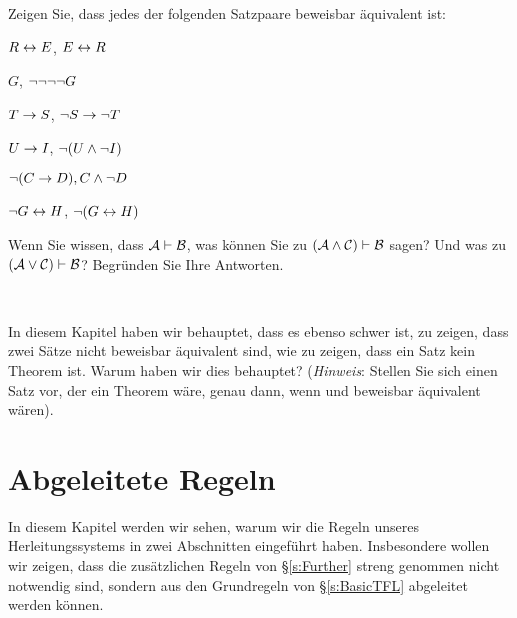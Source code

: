 \problempart
Zeigen Sie, dass jedes der folgenden Satzpaare beweisbar äquivalent ist:
\begin{earg}
\item $R \leftrightarrow E$, $E \leftrightarrow R$
\item $G$, $\neg\neg\neg\neg G$
\item $T\rightarrow S$, $\neg S \rightarrow \neg T$
\item $U \rightarrow I$, $\neg(U \wedge \neg I)$
\item $\neg (C \rightarrow D), C \wedge \neg D$
\item $\neg G \leftrightarrow H$, $\neg(G \leftrightarrow H)$ 
\end{earg}

\problempart
Wenn Sie wissen, dass $\mathcal{A}\vdash\mathcal{B}$, was können Sie zu $(\mathcal{A}\wedge\mathcal{C})\vdash\mathcal{B}$ sagen? Und was zu $(\mathcal{A}\vee\mathcal{C})\vdash\mathcal{B}$? Begründen Sie Ihre Antworten.

\

\problempart 
In diesem Kapitel haben wir behauptet, dass es ebenso schwer ist, zu zeigen, dass zwei Sätze nicht beweisbar äquivalent sind, wie zu zeigen, dass ein Satz kein Theorem ist. Warum haben wir dies behauptet? (\emph{Hinweis}: Stellen Sie sich einen Satz vor, der ein Theorem wäre, genau dann, wenn  und  beweisbar äquivalent wären).

\chapter{Abgeleitete Regeln}\label{s:Derived}
In diesem Kapitel werden wir sehen, warum wir die Regeln unseres Herleitungssystems in zwei Abschnitten eingeführt haben. Insbesondere wollen wir zeigen, dass die zusätzlichen Regeln von \S\ref{s:Further} streng genommen nicht notwendig sind, sondern aus den Grundregeln von \S\ref{s:BasicTFL} abgeleitet werden können. 

